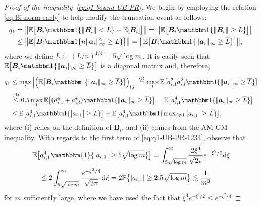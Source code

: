\begin{proof}[Proof of the inequality~\eqref{eq:q1-bound-UB-PR}] We begin by employing the relation \eqref{eq:Bi-norm-early} to help modify the truncation event as follows:
%
\begin{align*}
q_{1} & = \big\|\mathbb{E}\big[\bm{B}_{i}\mathbbm1\{\|\bm{B}_{i}\|<L\}-\mathbb{E}[\bm{B}_{i}]\big]\big\|
=\big\|\mathbb{E}\big[\bm{B}_{i}\mathbbm1\{\|\bm{B}_{i}\|\geq L\}\big]\big\|\\
 & \leq\big\|\mathbb{E}\big[\bm{B}_{i}\mathbbm1\{n\|\bm{a}_{i}\|_{\infty}^{4}\geq L\}\big]\big\|
  =\big\|\mathbb{E}\big[\bm{B}_{i}\mathbbm1\{\|\bm{a}_{i}\|_{\infty}\geq\overline{L}\}\big]\big\|,
\end{align*}
%
where
we define $\overline{L}\coloneqq(L/n)^{1/4}=5 \sqrt{\log m}$. It
is easily seen that $\mathbb{E}\big[\bm{B}_{i}\mathbbm1\{\|\bm{a}_{i}\|_{\infty}\geq\overline{L}\}\big]$
is a diagonal matrix and, therefore,
%
\begin{align}
 q_{1}  & \leq \max_l \Big|\Big(\mathbb{E}\big[\bm{B}_{i}\mathbbm1\{\|\bm{a}_{i}\|_{\infty}\geq\overline{L}\}\big]\Big)_{l,l}\Big|
	\overset{\mathrm{(i)}}{=} \max_l  \mathbb{E}\big[a_{i,1}^{2}a_{i,l}^{2}\mathbbm1\{\|\bm{a}_{i}\|_{\infty}\geq\overline{L}\}\big] \nonumber\\
	& \overset{\mathrm{(ii)}}{\leq} 0.5 \max_l  \mathbb{E}\big[(a_{i,1}^{4}+a_{i,l}^{4})\mathbbm1\{\|\bm{a}_{i}\|_{\infty}\geq\overline{L}\}\big]
   = \mathbb{E}\big[a_{i,1}^{4}\mathbbm1\{\|\bm{a}_{i}\|_{\infty}\geq\overline{L}\}\big] \nonumber\\
 & \leq \mathbb{E}\big[a_{i,1}^{4}\mathbbm1\{\big|a_{i,1}\big|\geq\overline{L}\}\big]+ \mathbb{E}\big[a_{i,1}^{4}\mathbbm1\{\max\nolimits_{j\neq1}\big|a_{i,j}\big|\geq\overline{L}\}\big],
\label{eq:q1-UB-PR-1234}
\end{align}
%
where (i) relies on the definition of $\bm{B}_i$, and (ii) comes from the AM-GM inequality. With regards to the first term of \eqref{eq:q1-UB-PR-1234}, observe that
%
\begin{align*}
	& \mathbb{E}\big[a_{i,1}^{4}\mathbbm{1}\{|a_{i,1}|\geq 5\sqrt{\log m}\}\big]
		=\int_{5\sqrt{\log m}}^{\infty}\frac{2\xi^{4}}{\sqrt{2\pi}}e^{-\xi^{2}/2} \mathrm{d}\xi \\
	& \quad \leq2\int_{5\sqrt{\log m}}^{\infty}\frac{e^{-\xi^{2}/4}}{\sqrt{2\pi}} \mathrm{d}\xi=2\mathbb{P}\big\{|a_{i,1}|\geq2.5\sqrt{\log m} \big\}\lesssim\frac{1}{m^3}
\end{align*}
%
for $m$ sufficiently large,
where we have used the fact that $\xi^{4}e^{-\xi^{2}/2}\leq e^{-\xi^{2}/4}$

\end{proof}
